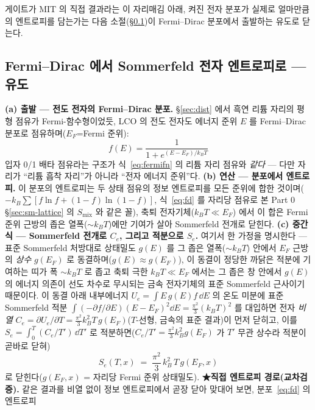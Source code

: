 게이트가 MIT 의 직접 결과라는 이 자리매김 아래, 켜진 전자 분포가 실제로 얼마만큼의 엔트로피를 담는가는
다음 소절(\S\ref{sec:lco-Se})이 Fermi--Dirac 분포에서 출발하는 유도로 닫는다.

\subsection{Fermi--Dirac 에서 Sommerfeld 전자 엔트로피로 --- 유도}\label{sec:lco-Se}
\textbf{(a) 출발 --- 전도 전자의 Fermi--Dirac 분포.} \S\ref{sec:dist} 에서 흑연 리튬 자리의 평형 점유가 Fermi-함수형이었듯, LCO 의 전도 전자도 에너지 준위 $E$ 를
Fermi--Dirac 분포로 점유하며($E_F$=Fermi 준위):
\begin{equation}
f(E)=\frac{1}{1+e^{(E-E_F)/k_BT}}
\label{eq:fd}
\end{equation}
입자 0/1 배타 점유라는 구조가 식~\eqref{eq:fermifn} 의 리튬 자리 점유와 \emph{같다} --- 다만 자리가 ``리튬 흡착
자리''가 아니라 ``전자 에너지 준위''다. \textbf{(b) 연산 --- 분포에서 엔트로피.} 이 분포의 엔트로피는 두 상태 점유의 정보 엔트로피를 모든 준위에 합한 것이며($-k_B\sum[f\ln f+(1-f)\ln(1-f)]$,
식~\eqref{eq:fd} 를 자리당 점유로 본 Part 0 \S\ref{sec:sm-lattice} 의 $S_\mathrm{mix}$ 와 같은 꼴), 축퇴 전자기체($k_BT\!\ll\!E_F$)
에서 이 합은 Fermi 준위 근방의 좁은 열폭($\sim k_BT$)에만 기여가 살아 Sommerfeld 전개로 닫힌다. \textbf{(c) 중간식 --- Sommerfeld 전개로 $C_e$, 그리고 적분으로 $S_e$.}
여기서 한 가정을 명시한다 --- 표준 Sommerfeld 처방대로 상태밀도 $g(E)$ 를 그 좁은 열폭($\sim k_BT$) 안에서 $E_F$
근방의 \emph{상수} $g(E_F)$ 로 동결하며($g(E)\approx g(E_F)$), 이 동결이 정당한 까닭은 적분에 기여하는 띠가 폭
$\sim k_BT$ 로 좁고 축퇴 극한 $k_BT\!\ll\!E_F$ 에서는 그 좁은 창 안에서 $g(E)$ 의 에너지 의존이 선도 차수로
무시되는 금속 전자기체의 표준 Sommerfeld 근사이기 때문이다. 이 동결 아래 내부에너지 $U_e=\int E\,g(E)f\,\dd E$ 의
온도 미분에 표준 Sommerfeld 적분 $\int(-\partial f/\partial E)(E-E_F)^2\dd E=\tfrac{\pi^2}{3}(k_BT)^2$ 를 대입하면
전자 \emph{비열} $C_e=\partial U_e/\partial T=\tfrac{\pi^2}{3}k_B^2T\,g(E_F)$($T$-선형, 금속의 표준 결과)이 먼저
닫히고, 이를 $S_e=\int_0^T (C_e/T')\,\dd T'$ 로 적분하면($C_e/T'=\tfrac{\pi^2}{3}k_B^2g(E_F)$ 가 $T'$ 무관 상수라
적분이 곧바로 닫혀)
\begin{equation}
S_e(T,x)\;=\;\frac{\pi^2}{3}\,k_B^2\,T\,g(E_F,x)
\label{eq:Se}
\end{equation}
로 닫힌다($g(E_F,x)$ = 자리당 Fermi 준위 상태밀도). \textbf{★직접 엔트로피 경로(교차검증).} 같은 결과를 비열 없이 정보 엔트로피에서 곧장 닫아 맞대어 보면, 분포~\eqref{eq:fd} 의 엔트로피
